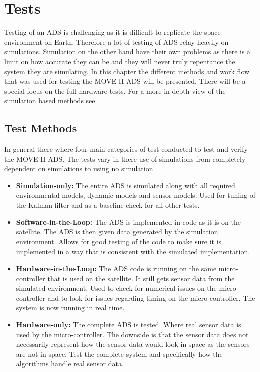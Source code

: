 \chapter{Tests}\label{chap:tests}
Testing of an ADS is challenging as it is difficult to replicate the space environment on Earth. Therefore a lot of testing of ADS relay heavily on simulations. Simulation on the other hand have their own problems as there is a limit on how accurate they can be and they will never truly repentance the system they are simulating. In this chapter the different methods and work flow that was used for testing the MOVE-II ADS will be presented. There will be a special focus on the full hardware tests. For a more in depth view of the simulation based methods see \cite{DavidThesis}           

\section{Test Methods}
In general there where four main categories of test conducted to test and verify the MOVE-II ADS. The tests vary in there use of simulations from completely dependent on simulations to using no simulation. 

\begin{itemize}
  \item \textbf{Simulation-only:} The entire ADS is simulated along with all required environmental models, dynamic models and sensor models. Used for tuning of the Kalman filter and as a baseline check for all other tests.   
  \item \textbf{Software-in-the-Loop:} The ADS is implemented in code as it is on the satellite. The ADS is then given data generated by the simulation environment. Allows for good testing of the code to make sure it is implemented in a way that is consistent with the simulated implementation.    
  \item \textbf{Hardware-in-the-Loop:} The ADS code is running on the same micro-controller that is used on the satellite. It still gets sensor data from the simulated environment. Used to check for numerical issues on the micro-controller and to look for issues regarding timing on the micro-controller. The system is now running in real time.    
  \item \textbf{Hardware-only:} The complete ADS is tested. Where real sensor data is used by the micro-controller. The downside is that the sensor data does not necessarily represent how the sensor data would look in space as the sensors are not in space. Test the complete system and specifically how the algorithms handle real sensor data.        
\end{itemize}  

